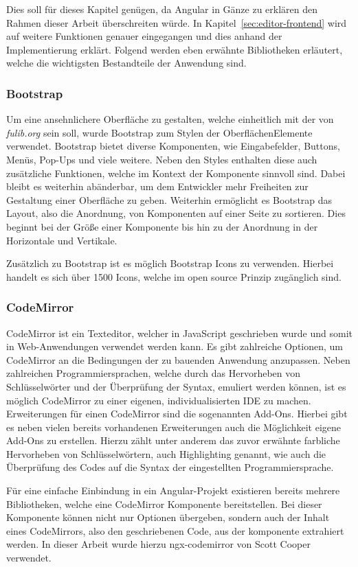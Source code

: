Dies soll für dieses Kapitel genügen, da Angular in Gänze zu erklären den Rahmen dieser Arbeit überschreiten würde.
In Kapitel~\ref{sec:editor-frontend} wird auf weitere Funktionen genauer eingegangen und dies anhand der Implementierung erklärt.
Folgend werden eben erwähnte Bibliotheken erläutert, welche die wichtigsten Bestandteile der Anwendung sind.

\subsubsection{Bootstrap}
Um eine ansehnlichere Oberfläche zu gestalten, welche einheitlich mit der von \textit{fulib.org} sein soll, wurde Bootstrap zum
Stylen der OberflächenElemente verwendet.
Bootstrap bietet diverse Komponenten, wie Eingabefelder, Buttons, Menüs, Pop-Ups und viele weitere.
Neben den Styles enthalten diese auch zusätzliche Funktionen, welche im Kontext der Komponente sinnvoll sind.
Dabei bleibt es weiterhin abänderbar, um dem Entwickler mehr Freiheiten zur Gestaltung einer Oberfläche zu geben.
Weiterhin ermöglicht es Bootstrap das Layout, also die Anordnung, von Komponenten auf einer Seite zu sortieren.
Dies beginnt bei der Größe einer Komponente bis hin zu der Anordnung in der Horizontale und Vertikale.\cite*{bs}

Zusätzlich zu Bootstrap ist es möglich Bootstrap Icons zu verwenden.
Hierbei handelt es sich über 1500 Icons, welche im open source Prinzip zugänglich sind.\cite*{bsIcons}

\subsubsection{CodeMirror}
CodeMirror ist ein Texteditor, welcher in JavaScript geschrieben wurde und somit in Web-Anwendungen verwendet werden kann.
Es gibt zahlreiche Optionen, um CodeMirror an die Bedingungen der zu bauenden Anwendung anzupassen.
Neben zahlreichen Programmiersprachen, welche durch das Hervorheben von Schlüsselwörter und der Überprüfung der Syntax, emuliert werden können,
ist es möglich CodeMirror zu einer eigenen, individualisierten IDE zu machen.
Erweiterungen für einen CodeMirror sind die sogenannten Add-Ons.
Hierbei gibt es neben vielen bereits vorhandenen Erweiterungen auch die Möglichkeit eigene Add-Ons zu erstellen.
Hierzu zählt unter anderem das zuvor erwähnte farbliche Hervorheben von Schlüsselwörtern, auch Highlighting genannt, wie auch die
Überprüfung des Codes auf die Syntax der eingestellten Programmiersprache.\cite*{cm}

Für eine einfache Einbindung in ein Angular-Projekt existieren bereits mehrere Bibliotheken, welche eine CodeMirror Komponente bereitstellen.
Bei dieser Komponente können nicht nur Optionen übergeben, sondern auch der Inhalt eines CodeMirrors, also den geschriebenen Code, aus der komponente
extrahiert werden.
In dieser Arbeit wurde hierzu ngx-codemirror von Scott Cooper verwendet.\cite*{ngxcm}
